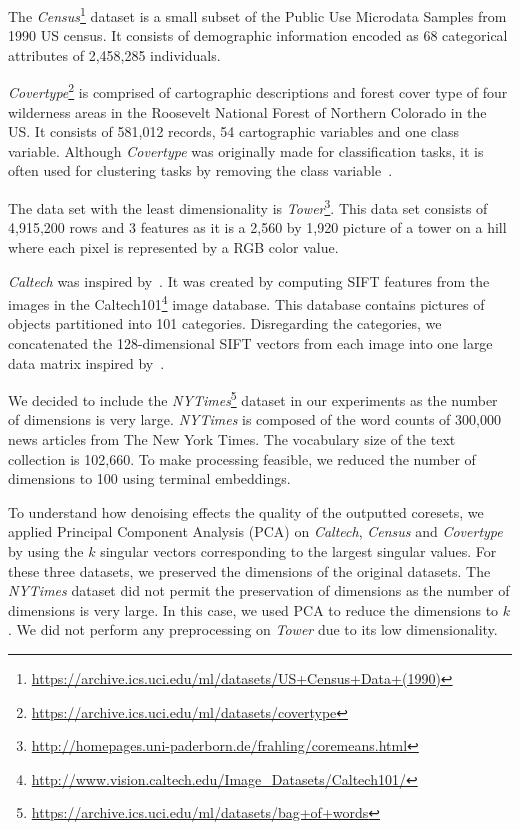 The \textit{Census}\footnote{\url{https://archive.ics.uci.edu/ml/datasets/US+Census+Data+(1990)}} dataset is a small subset of the Public Use Microdata Samples from 1990 US census. It consists of demographic information encoded as 68 categorical attributes of 2,458,285 individuals. 

\textit{Covertype}\footnote{\url{https://archive.ics.uci.edu/ml/datasets/covertype}} is comprised of cartographic descriptions and forest cover type of four wilderness areas in the Roosevelt National Forest of Northern Colorado in the US. It consists of 581,012 records, 54 cartographic variables and one class variable. Although \textit{Covertype} was originally made for classification tasks, it is often used for clustering tasks by removing the class variable~\cite{AckermannMRSLS12}.

The data set with the least dimensionality is \textit{Tower}\footnote{\url{http://homepages.uni-paderborn.de/frahling/coremeans.html}}. This data set consists of 4,915,200 rows and 3 features as it is a 2,560 by 1,920 picture of a tower on a hill where each pixel is represented by a RGB color value. 



\textit{Caltech} was inspired by~\cite{FGSSS13}. It was created by computing SIFT features from the images in the Caltech101\footnote{\url{http://www.vision.caltech.edu/Image_Datasets/Caltech101/}} image database. This database contains pictures of objects partitioned into 101 categories. Disregarding the categories, we concatenated the 128-dimensional SIFT vectors from each image into one large data matrix inspired by~\cite{FGSSS13}. 

We decided to include the \textit{NYTimes}\footnote{\url{https://archive.ics.uci.edu/ml/datasets/bag+of+words}} dataset in our experiments as the number of dimensions is very large. \textit{NYTimes} is composed of the word counts of 300,000 news articles from The New York Times. The vocabulary size of the text collection is 102,660. To make processing feasible, we reduced the number of dimensions to 100 using terminal embeddings.

To understand how denoising effects the quality of the outputted coresets, we applied Principal Component Analysis (PCA) on \textit{Caltech}, \textit{Census} and \textit{Covertype} by using the $k$ singular vectors corresponding to the largest singular values. For these three datasets, we preserved the dimensions of the original datasets.  
The \textit{NYTimes} dataset did not permit the preservation of dimensions as the number of dimensions is very large. In this case, we used PCA to reduce the dimensions to $k$.
We did not perform any preprocessing on \textit{Tower} due to its low dimensionality.





